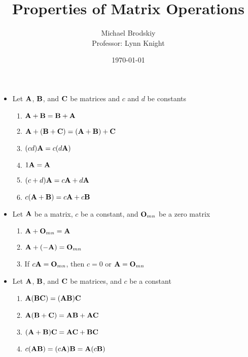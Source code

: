 \documentclass[12pt]{article}
\title{Properties of Matrix Operations}
\date{\today}
\author{Michael Brodskiy\\ \small Professor: Lynn Knight}
\begin{document}
\maketitle

\begin{itemize}

  \item Let $\bold{A}$, $\bold{B}$, and $\bold{C}$ be matrices and $c$ and $d$ be constants

    \begin{enumerate}

      \item $\bold{A}+\bold{B}=\bold{B}+\bold{A}$

      \item $\bold{A}+(\bold{B}+\bold{C})=(\bold{A}+\bold{B})+\bold{C}$

      \item $(cd)\bold{A}=c(d\bold{A})$

      \item $1\bold{A}=\bold{A}$

      \item $(c+d)\bold{A}=c\bold{A}+d\bold{A}$

      \item $c(\bold{A}+\bold{B})=c\bold{A}+c\bold{B}$

    \end{enumerate}

  \item Let $\bold{A}$ be a matrix, $c$ be a constant, and $\bold{O}_{mn}$ be a zero matrix

    \begin{enumerate}

      \item $\bold{A}+\bold{O}_{mn}=\bold{A}$

      \item $\bold{A} + (-\bold{A})=\bold{O}_{mn}$

      \item If $c\bold{A}=\bold{O}_{mn}$, then $c=0$ or $\bold{A}=\bold{O}_{mn}$

    \end{enumerate}

  \item Let $\bold{A}$, $\bold{B}$, and $\bold{C}$ be matrices, and $c$ be a constant

    \begin{enumerate}

      \item $\bold{A}(\bold{BC})=(\bold{AB})\bold{C}$

      \item $\bold{A}(\bold{B}+\bold{C})=\bold{AB}+\bold{AC}$

      \item $(\bold{A}+\bold{B})\bold{C}=\bold{AC}+\bold{BC}$

      \item $c(\bold{AB})=(c\bold{A})\bold{B}=\bold{A}(c\bold{B})$

    \end{enumerate}

\end{itemize}
\end{document}
